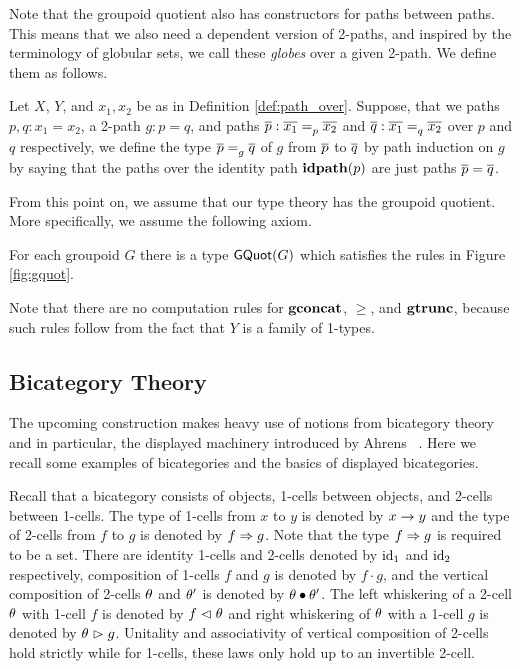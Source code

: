 Note that the groupoid quotient also has constructors for paths between paths.
This means that we also need a dependent version of 2-paths,
and inspired by the terminology of globular sets, we call these \emph{globes} over a given 2-path.
We define them as follows.

\begin{definition}
\label{def:globe_over}
Let $X$, $Y$, and $x_1, x_2$ be as in Definition \ref{def:path_over}.
Suppose, that we paths $p, q : x_1 = x_2$,
a 2-path $g : p = q$,
and paths $\pover{p} : \pathover{p}{\overline{x_1}}{\overline{x_2}}$ and $\pover{q} : \pathover{q}{\overline{x_1}}{\overline{x_2}}$ over $p$ and $q$ respectively,
we define the type $\globeover{g}{\pover{p}}{\pover{q}}$ of  $g$ from $\pover{p}$ to $\pover{q}$ by path induction on $g$
by saying that the paths over the identity path $\refl{p}$ are just paths $\pover{p} = \pover{q}$.
\end{definition}

From this point on, we assume that our type theory has the groupoid quotient.
More specifically, we assume the following axiom.

\begin{axiom}
For each groupoid $G$ there is a type $\gquotType(G)$ which satisfies the rules in Figure \ref{fig:gquot}.
\end{axiom}

Note that there are no computation rules for $\gconcat$, $\ge$, and $\gtrunc$,
because such rules follow from the fact that $Y$ is a family of 1-types.

\subsection{Bicategory Theory}
The upcoming construction makes heavy use of notions from bicategory theory \cite{10.1007/BFb0074299,leinster:basic-bicats}
and in particular, the displayed machinery introduced by Ahrens \etal \ \cite{bicatjournal}.
Here we recall some examples of bicategories and the basics of displayed bicategories.

Recall that a bicategory consists of objects, 1-cells between objects, and 2-cells between 1-cells.
The type of 1-cells from $x$ to $y$ is denoted by $x \onecell y$ and the type of 2-cells from $f$ to $g$ is denoted by $f \twocell g$.
Note that the type $f \twocell g$ is required to be a set.
There are identity 1-cells and 2-cells denoted by $\id_1$ and $\id_2$ respectively, composition of 1-cells $f$ and $g$ is denoted by $f \cdot g$,
and the vertical composition of 2-cells $\tc$ and $\tc'$ is denoted by $\tc \vcomp \tc'$.
The left whiskering of a 2-cell $\tc$ with 1-cell $f$ is denoted by $f \whiskerl \tc$ and right whiskering of $\tc$ with a 1-cell $g$ is denoted by $\tc \whiskerr g$. 
Unitality and associativity of vertical composition of 2-cells hold strictly while for 1-cells, these laws only hold up to an invertible 2-cell.

